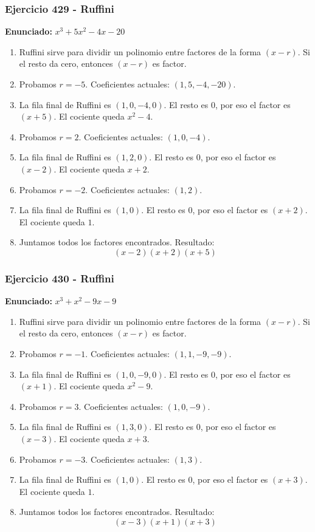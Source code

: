 \documentclass[11pt,a4paper]{article}
\begin{document}
\vspace{0.2cm}
\subsubsection*{Ejercicio 429 - Ruffini}
\textbf{Enunciado:} $ x^{3} + 5 x^{2} - 4 x - 20 $\par
\begin{enumerate}[leftmargin=2em]
\item Ruffini sirve para dividir un polinomio entre factores de la forma \((x-r)\). Si el resto da cero, entonces \((x-r)\) es factor.
\item Probamos \(r=-5\). Coeficientes actuales: \((1, 5, -4, -20)\).
\item La fila final de Ruffini es \((1, 0, -4, 0)\). El resto es \(0\), por eso el factor es \((x+5)\). El cociente queda \(x^{2} - 4\).
\item Probamos \(r=2\). Coeficientes actuales: \((1, 0, -4)\).
\item La fila final de Ruffini es \((1, 2, 0)\). El resto es \(0\), por eso el factor es \((x-2)\). El cociente queda \(x + 2\).
\item Probamos \(r=-2\). Coeficientes actuales: \((1, 2)\).
\item La fila final de Ruffini es \((1, 0)\). El resto es \(0\), por eso el factor es \((x+2)\). El cociente queda \(1\).
\item Juntamos todos los factores encontrados. Resultado: \[\boxed{\left(x - 2\right) \left(x + 2\right) \left(x + 5\right)}\]
\end{enumerate}

\vspace{0.2cm}
\subsubsection*{Ejercicio 430 - Ruffini}
\textbf{Enunciado:} $ x^{3} + x^{2} - 9 x - 9 $\par
\begin{enumerate}[leftmargin=2em]
\item Ruffini sirve para dividir un polinomio entre factores de la forma \((x-r)\). Si el resto da cero, entonces \((x-r)\) es factor.
\item Probamos \(r=-1\). Coeficientes actuales: \((1, 1, -9, -9)\).
\item La fila final de Ruffini es \((1, 0, -9, 0)\). El resto es \(0\), por eso el factor es \((x+1)\). El cociente queda \(x^{2} - 9\).
\item Probamos \(r=3\). Coeficientes actuales: \((1, 0, -9)\).
\item La fila final de Ruffini es \((1, 3, 0)\). El resto es \(0\), por eso el factor es \((x-3)\). El cociente queda \(x + 3\).
\item Probamos \(r=-3\). Coeficientes actuales: \((1, 3)\).
\item La fila final de Ruffini es \((1, 0)\). El resto es \(0\), por eso el factor es \((x+3)\). El cociente queda \(1\).
\item Juntamos todos los factores encontrados. Resultado: \[\boxed{\left(x - 3\right) \left(x + 1\right) \left(x + 3\right)}\]
\end{enumerate}
\end{document}
